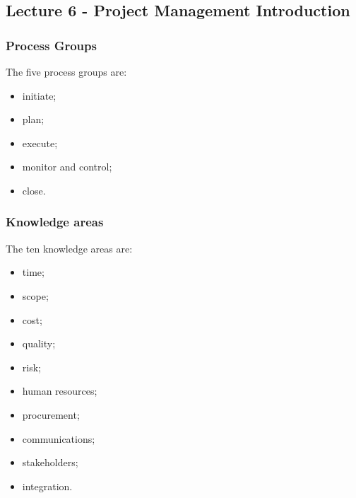 \documentclass[journal]{IEEEtran}
\begin{document}
\subsection{\textbf{Lecture 6 - Project Management Introduction}}
\subsubsection{Process Groups}
The five process groups are:
\begin{itemize}
	\item initiate;
	\item plan;
	\item execute;
	\item monitor and control;
	\item close.
\end{itemize}
\subsubsection{Knowledge areas}
The ten knowledge areas are:
\begin{itemize}
	\item time;
	\item scope;
	\item cost;
	\item quality;
	\item risk;
	\item human resources;
	\item procurement;
	\item communications;
	\item stakeholders;
	\item integration.
\end{itemize}
\end{document}
